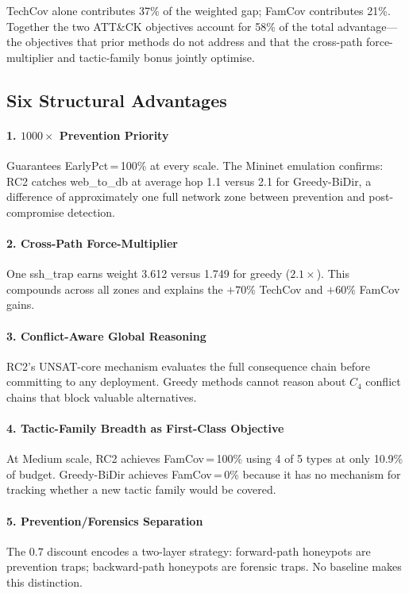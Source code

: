 \documentclass[journal]{IEEEtran}
\begin{document}
TechCov alone contributes 37\% of the weighted gap; FamCov contributes
21\%. Together the two ATT\&CK objectives account for 58\% of the total
advantage---the objectives that prior methods do not address and that
the cross-path force-multiplier and tactic-family bonus jointly optimise.

\subsection{Six Structural Advantages}

\paragraph{1. $1000\times$ Prevention Priority}
Guarantees EarlyPct\,=\,100\% at every scale. The Mininet emulation
confirms: RC2 catches web\_to\_db at average hop 1.1 versus 2.1 for
Greedy-BiDir, a difference of approximately one full network zone
between prevention and post-compromise detection.

\paragraph{2. Cross-Path Force-Multiplier}
One ssh\_trap earns weight 3.612 versus 1.749 for greedy ($2.1\times$).
This compounds across all zones and explains the $+70\%$ TechCov and
$+60\%$ FamCov gains.

\paragraph{3. Conflict-Aware Global Reasoning}
RC2's UNSAT-core mechanism evaluates the full consequence chain before
committing to any deployment. Greedy methods cannot reason about
$C_4$ conflict chains that block valuable alternatives.

\paragraph{4. Tactic-Family Breadth as First-Class Objective}
At Medium scale, RC2 achieves FamCov\,=\,100\% using 4 of 5 types at
only 10.9\% of budget. Greedy-BiDir achieves FamCov\,=\,0\% because
it has no mechanism for tracking whether a new tactic family would be
covered.

\paragraph{5. Prevention/Forensics Separation}
The $0.7$ discount encodes a two-layer strategy: forward-path honeypots
are prevention traps; backward-path honeypots are forensic traps. No
baseline makes this distinction.
\end{document}
